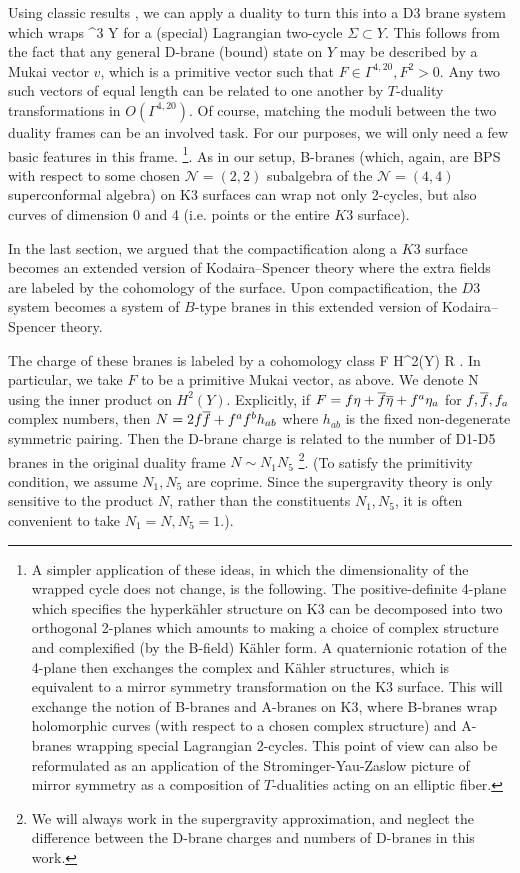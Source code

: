 \documentclass[../main.tex]{subfiles}
\begin{document}
Using classic results \cite{Dijkgraaf:1998gf}, we can apply a duality to turn this into a D3 brane system which wraps 
\beqn
\C {} \times \Sigma \subset \C^3 \times Y 
\eeqn
for a (special) Lagrangian two-cycle $\Sigma \subset Y$. 
This follows from the fact that any general D-brane (bound) state on $Y$ may be described by a Mukai vector $v$, which is a primitive vector such that $F \in \Gamma^{4, 20}, F^2>0$. 
Any two such vectors of equal length can be related to one another by $T$-duality transformations in $O(\Gamma^{4, 20})$. Of course, matching the moduli between the two duality frames can be an involved task. For our purposes, we will only need a few basic features in this frame. \footnote{A simpler application of these ideas, in which the dimensionality of the wrapped cycle does not change, is the following. The positive-definite 4-plane which specifies the hyperk{\"a}hler structure on K3 can be decomposed into two orthogonal 2-planes which amounts to making a choice of complex structure and complexified (by the B-field) K{\"a}hler form. A quaternionic rotation of the 4-plane then exchanges the complex and K{\"a}hler structures, which is equivalent to a mirror symmetry transformation on the K3 surface. This will exchange the notion of B-branes and A-branes on K3, where B-branes wrap holomorphic curves (with respect to a chosen complex structure) and A-branes wrapping special Lagrangian 2-cycles. This point of view can also be reformulated as an application of the Strominger-Yau-Zaslow \cite{SYZ} picture of mirror symmetry as a composition of $T$-dualities acting on an elliptic fiber.}. As in our setup, B-branes (which, again, are BPS with respect to some chosen $\mathcal{N}=(2, 2)$ subalgebra of the $\mathcal{N}=(4, 4)$ superconformal algebra) on K3 surfaces can wrap not only 2-cycles, but also curves of dimension 0 and 4 (i.e. points or the entire $K3$ surface).

In the last section, we argued that the compactification along a $K3$ surface becomes an extended version of Kodaira--Spencer theory where the extra fields are labeled by the cohomology of the surface.
Upon compactification, the $D3$ system becomes a system of $B$-type branes in this extended version of Kodaira--Spencer theory.

The charge of these branes is labeled by a cohomology class 
\beqn
F \in H^2(Y) \subset R .
\eeqn
 In particular, we take $F$ to be a primitive Mukai vector, as above. We denote 
\beqn
N  {}
\eeqn
using the inner product on $H^2(Y)$. 
Explicitly, if $F = f \eta + \overline f \overline \eta + f^a \eta_a$ for $f, \overline f, f_a$ complex numbers, then $N = 2 f \overline f + f^{a} f^{b} h_{ab}$ where $h_{ab}$ is the fixed non-degenerate symmetric pairing. Then the D-brane charge is related to the number of D1-D5 branes in the original duality frame $N \sim N_1 N_5$ \footnote{We will always work in the supergravity approximation, and neglect the difference between the D-brane charges and numbers of D-branes in this work.}. (To satisfy the primitivity condition, we assume $N_1, N_5$ are coprime. Since the supergravity theory is only sensitive to the product $N$, rather than the constituents $N_1, N_5$, it is often convenient to take $N_1 = N, N_5 = 1$.).
\end{document}
